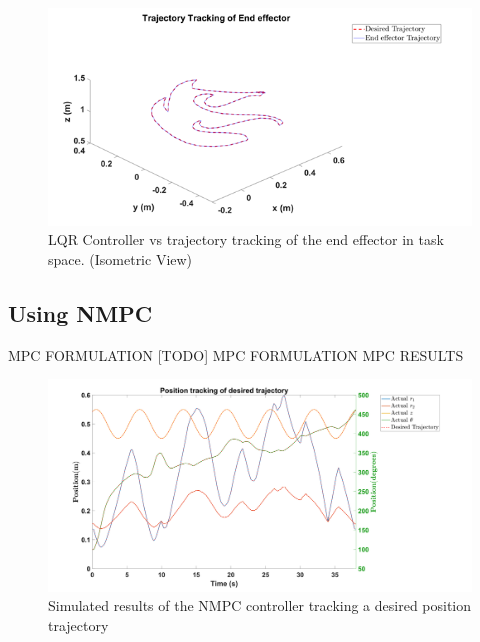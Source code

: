 \documentclass{UoNMCHA}
\numberwithin{equation}{section}
\begin{document}
	\begin{figure}[H]
		\begin{center}
			\includegraphics[width=1\linewidth]{figs/Picture323}
			\caption{LQR Controller vs trajectory tracking of the end effector in task space. (Isometric View)}
			\label{figs/Picture323}
		\end{center}
	\end{figure}
	
	\newpage
	\subsection{Using NMPC}
	
	MPC FORMULATION
	[TODO] MPC FORMULATION
	MPC RESULTS
	
	\begin{figure}[H]
		\begin{center}
			\includegraphics[width=1\linewidth]{figs/Picture33}
			\caption{Simulated results of the NMPC controller tracking a desired position trajectory}
			\label{figs/Picture33}
		\end{center}
	\end{figure}
	
\end{document}

